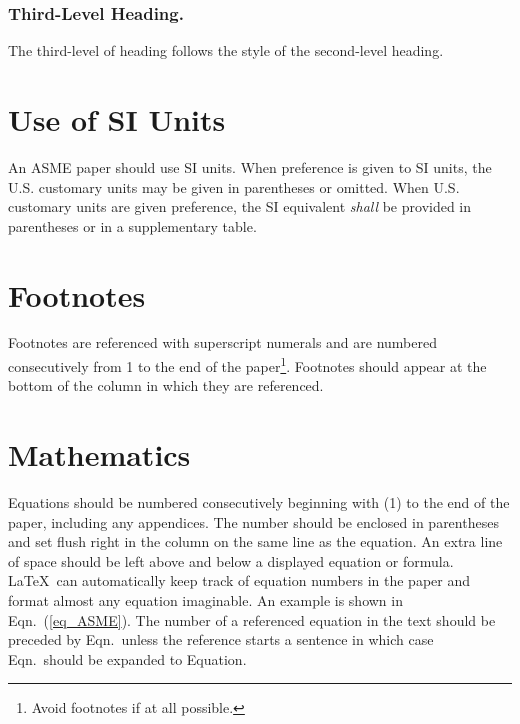 \documentclass[twocolumn,10pt]{asme2ej}
\begin{document}
\subsubsection{Third-Level Heading.}

The third-level of heading follows the style of the second-level heading.


\section{Use of SI Units}

An ASME paper should use SI units.  When preference is given to SI units, the U.S. customary units may be given in parentheses or omitted. When U.S. customary units are given preference, the SI equivalent {\em shall} be provided in parentheses or in a supplementary table. 

\section{Footnotes\protect\footnotemark}

Footnotes are referenced with superscript numerals and are numbered consecutively from 1 to the end of the paper\footnote{Avoid footnotes if at all possible.}. Footnotes should appear at the bottom of the column in which they are referenced.


\section{Mathematics}

Equations should be numbered consecutively beginning with (1) to the end of the paper, including any appendices.  The number should be enclosed in parentheses and set flush right in the column on the same line as the equation.  An extra line of space should be left above and below a displayed equation or formula. \LaTeX\ can automatically keep track of equation numbers in the paper and format almost any equation imaginable. An example is shown in Eqn.~(\ref{eq_ASME}). The number of a referenced equation in the text should be preceded by Eqn.\ unless the reference starts a sentence in which case Eqn.\ should be expanded to Equation.
\end{document}
